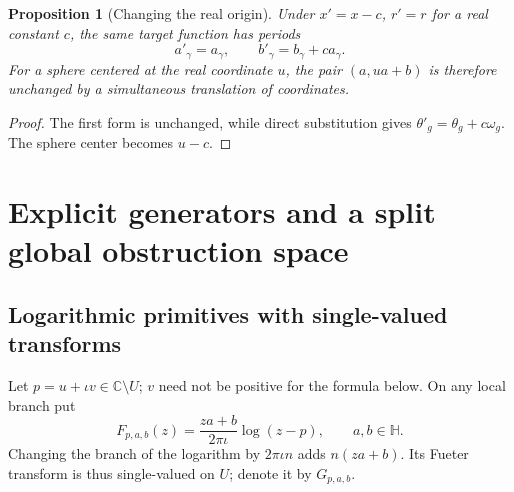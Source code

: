 \documentclass[11pt,a4paper]{article}
\numberwithin{equation}{section}
\newtheorem{proposition}[theorem]{Proposition}
\theoremstyle{definition}
\theoremstyle{remark}
\newcommand{\C}{\mathbb C}
\newcommand{\HH}{\mathbb H}
\begin{document}
\begin{proposition}[Changing the real origin]
\label{prop:translation}
Under $x'=x-c$, $r'=r$ for a real constant $c$, the same target function has
periods
\[
 a'_\gamma=a_\gamma,\qquad b'_\gamma=b_\gamma+c a_\gamma.
\]
For a sphere centered at the real coordinate $u$, the pair
$(a,ua+b)$ is therefore unchanged by a simultaneous translation of coordinates.
\end{proposition}
\begin{proof}
The first form is unchanged, while direct substitution gives
$\theta'_g=\theta_g+c\omega_g$. The sphere center becomes $u-c$.
\end{proof}

\section{Explicit generators and a split global obstruction space}
\label{sec:generators}

\subsection{Logarithmic primitives with single-valued transforms}
Let $p=u+\iota v\in\C\setminus U$; $v$ need not be positive for the formula
below. On any local branch put
\begin{equation}
 F_{p,a,b}(z)=\frac{za+b}{2\pi\iota}\log(z-p),
 \qquad a,b\in\HH.
 \label{eq:logprimitive}
\end{equation}
Changing the branch of the logarithm by $2\pi\iota n$ adds
$n(za+b)$. Its Fueter transform is thus single-valued on $U$; denote it by
$G_{p,a,b}$.
\end{document}
